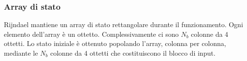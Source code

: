 \subsubsection{Array di stato}
Rijndael mantiene un array di stato rettangolare durante il funzionamento. Ogni elemento dell'array è un ottetto. Complessivamente ci sono $N_{b}$ colonne da 4 ottetti. Lo stato iniziale è ottenuto popolando l’array, colonna per colonna, mediante le $N_{b}$ colonne da 4 ottetti che costituiscono il blocco di input. 

